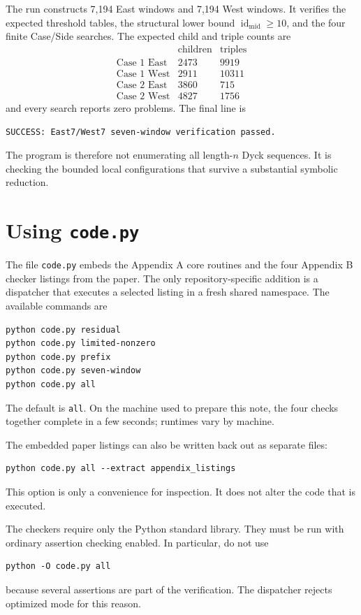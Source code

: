 \documentclass{article}
\begin{document}
The run constructs 7,194 East windows and 7,194 West windows.  It verifies the
expected threshold tables, the structural lower bound
$\operatorname{id}_{\mathrm{mid}}\geq10$, and the four finite Case/Side
searches.  The expected child and triple counts are
\[
\begin{array}{c|r|r}
&\text{children}&\text{triples}\\
\hline
\text{Case 1 East}&2473&9919\\
\text{Case 1 West}&2911&10311\\
\text{Case 2 East}&3860&715\\
\text{Case 2 West}&4827&1756
\end{array}
\]
and every search reports zero problems.  The final line is
\begin{verbatim}
SUCCESS: East7/West7 seven-window verification passed.
\end{verbatim}
The program is therefore not enumerating all length-$n$ Dyck sequences.  It is
checking the bounded local configurations that survive a substantial symbolic
reduction.

\section{Using \texttt{code.py}}

The file \texttt{code.py} embeds the Appendix A core routines and the four
Appendix B checker listings from the paper.  The only repository-specific
addition is a dispatcher that executes a selected listing in a fresh shared
namespace.  The available commands are
\begin{verbatim}
python code.py residual
python code.py limited-nonzero
python code.py prefix
python code.py seven-window
python code.py all
\end{verbatim}
The default is \texttt{all}.  On the machine used to prepare this note, the
four checks together complete in a few seconds; runtimes vary by machine.

The embedded paper listings can also be written back out as separate files:
\begin{verbatim}
python code.py all --extract appendix_listings
\end{verbatim}
This option is only a convenience for inspection.  It does not alter the code
that is executed.

The checkers require only the Python standard library.  They must be run with
ordinary assertion checking enabled.  In particular, do not use
\begin{verbatim}
python -O code.py all
\end{verbatim}
because several assertions are part of the verification.  The dispatcher
rejects optimized mode for this reason.
\end{document}

